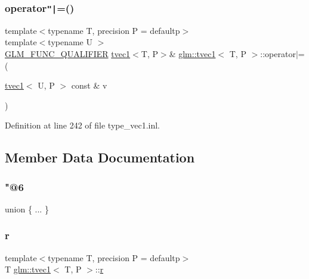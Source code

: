 \subsubsection{\texorpdfstring{operator\texttt{"|}=()}{operator|=()}\hspace{0.1cm}{\footnotesize\ttfamily [4/4]}}
{\footnotesize\ttfamily template$<$typename T, precision P = defaultp$>$ \\
template$<$typename U $>$ \\
\mbox{\hyperlink{setup_8hpp_a33fdea6f91c5f834105f7415e2a64407}{G\+L\+M\+\_\+\+F\+U\+N\+C\+\_\+\+Q\+U\+A\+L\+I\+F\+I\+ER}} \mbox{\hyperlink{structglm_1_1tvec1}{tvec1}}$<$T, P$>$\& \mbox{\hyperlink{structglm_1_1tvec1}{glm\+::tvec1}}$<$ T, P $>$\+::operator$\vert$= (\begin{DoxyParamCaption}\item[{\mbox{\hyperlink{structglm_1_1tvec1}{tvec1}}$<$ U, P $>$ const \&}]{v }\end{DoxyParamCaption})}



Definition at line 242 of file type\+\_\+vec1.\+inl.



\subsection{Member Data Documentation}
\mbox{\label{structglm_1_1tvec1_a4ea1074512d919b3c29f249a1a11db02}} 
\subsubsection{\texorpdfstring{"@6}{@6}}
{\footnotesize\ttfamily union \{ ... \} }

\mbox{\label{structglm_1_1tvec1_a7f3893144bf66ec97a3e0a45cceac7b6}} 
\subsubsection{\texorpdfstring{r}{r}}
{\footnotesize\ttfamily template$<$typename T, precision P = defaultp$>$ \\
T \mbox{\hyperlink{structglm_1_1tvec1}{glm\+::tvec1}}$<$ T, P $>$\+::\mbox{\hyperlink{glad_8h_abe08814c2f72843fde4d8df41440d5a0}{r}}}



